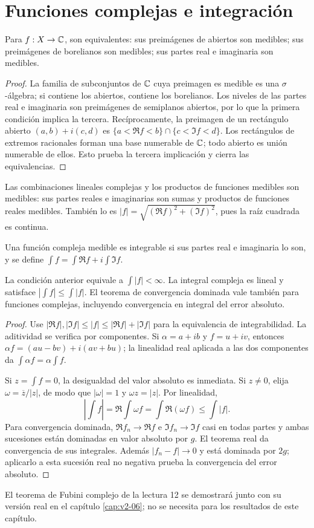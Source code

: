 \section{Funciones complejas e integración}\label{lectura:v2-12}
\begin{proposicion}
Para $f:X\to\mathbb C$, son equivalentes: sus preimágenes de abiertos son medibles; sus preimágenes de borelianos son medibles; sus partes real e imaginaria son medibles.
\end{proposicion}
\begin{proof}
La familia de subconjuntos de $\mathbb C$ cuya preimagen es medible es una $\sigma$-álgebra; si contiene los abiertos, contiene los borelianos. Los niveles de las partes real e imaginaria son preimágenes de semiplanos abiertos, por lo que la primera condición implica la tercera. Recíprocamente, la preimagen de un rectángulo abierto $(a,b)+i(c,d)$ es $\{a<\Re f<b\}\cap\{c<\Im f<d\}$. Los rectángulos de extremos racionales forman una base numerable de $\mathbb C$; todo abierto es unión numerable de ellos. Esto prueba la tercera implicación y cierra las equivalencias.
\end{proof}
Las combinaciones lineales complejas y los productos de funciones medibles son medibles: sus partes reales e imaginarias son sumas y productos de funciones reales medibles. También lo es $|f|=\sqrt{(\Re f)^2+(\Im f)^2}$, pues la raíz cuadrada es continua.

\begin{definicion}
Una función compleja medible es integrable si sus partes real e imaginaria lo son, y se define $\int f=\int\Re f+i\int\Im f$.
\end{definicion}
\begin{teorema}\label{teo:v2-complejas}
La condición anterior equivale a $\int|f|<\infty$. La integral compleja es lineal y satisface $|\int f|\le\int|f|$. El teorema de convergencia dominada vale también para funciones complejas, incluyendo convergencia en integral del error absoluto.
\end{teorema}
\begin{proof}
Use $|\Re f|,|\Im f|\le|f|\le|\Re f|+|\Im f|$ para la equivalencia de integrabilidad. La aditividad se verifica por componentes. Si $\alpha=a+ib$ y $f=u+iv$, entonces $\alpha f=(au-bv)+i(av+bu)$; la linealidad real aplicada a las dos componentes da $\int\alpha f=\alpha\int f$.

Si $z=\int f=0$, la desigualdad del valor absoluto es inmediata. Si $z\ne0$, elija $\omega=\overline z/|z|$, de modo que $|\omega|=1$ y $\omega z=|z|$. Por linealidad,
\[\left|\int f\right|=\Re\int\omega f=\int\Re(\omega f)\le\int|f|.\]
Para convergencia dominada, $\Re f_n\to\Re f$ e $\Im f_n\to\Im f$ casi en todas partes y ambas sucesiones están dominadas en valor absoluto por $g$. El teorema real da convergencia de sus integrales. Además $|f_n-f|\to0$ y está dominada por $2g$; aplicarlo a esta sucesión real no negativa prueba la convergencia del error absoluto.
\end{proof}
El teorema de Fubini complejo de la lectura 12 se demostrará junto con su versión real en el capítulo \ref{cap:v2-06}; no se necesita para los resultados de este capítulo.

